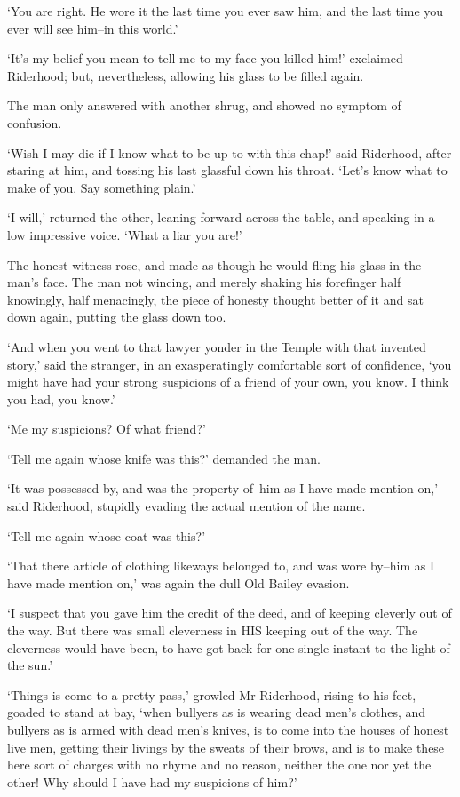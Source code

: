 ‘You are right. He wore it the last time you ever saw him, and the last
time you ever will see him--in this world.’

‘It’s my belief you mean to tell me to my face you killed him!’
exclaimed Riderhood; but, nevertheless, allowing his glass to be filled
again.

The man only answered with another shrug, and showed no symptom of
confusion.

‘Wish I may die if I know what to be up to with this chap!’ said
Riderhood, after staring at him, and tossing his last glassful down his
throat. ‘Let’s know what to make of you. Say something plain.’

‘I will,’ returned the other, leaning forward across the table, and
speaking in a low impressive voice. ‘What a liar you are!’

The honest witness rose, and made as though he would fling his glass in
the man’s face. The man not wincing, and merely shaking his forefinger
half knowingly, half menacingly, the piece of honesty thought better of
it and sat down again, putting the glass down too.

‘And when you went to that lawyer yonder in the Temple with that
invented story,’ said the stranger, in an exasperatingly comfortable
sort of confidence, ‘you might have had your strong suspicions of a
friend of your own, you know. I think you had, you know.’

‘Me my suspicions? Of what friend?’

‘Tell me again whose knife was this?’ demanded the man.

‘It was possessed by, and was the property of--him as I have made
mention on,’ said Riderhood, stupidly evading the actual mention of the
name.

‘Tell me again whose coat was this?’

‘That there article of clothing likeways belonged to, and was wore
by--him as I have made mention on,’ was again the dull Old Bailey
evasion.

‘I suspect that you gave him the credit of the deed, and of keeping
cleverly out of the way. But there was small cleverness in HIS keeping
out of the way. The cleverness would have been, to have got back for one
single instant to the light of the sun.’

‘Things is come to a pretty pass,’ growled Mr Riderhood, rising to his
feet, goaded to stand at bay, ‘when bullyers as is wearing dead men’s
clothes, and bullyers as is armed with dead men’s knives, is to come
into the houses of honest live men, getting their livings by the sweats
of their brows, and is to make these here sort of charges with no rhyme
and no reason, neither the one nor yet the other! Why should I have had
my suspicions of him?’

